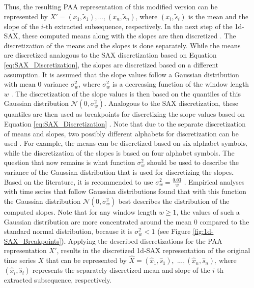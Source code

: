 Thus, the resulting \ac{PAA} representation of this modified version can be represented by $X' = (\overline{x}_1, \tilde{s}_1), ..., (\overline{x}_n, \tilde{s}_n)$, where $(\overline{x}_i, \tilde{s}_i)$ is the mean and the slope of the $i$-th extracted subsequence, respectively. \newline
In the next step of the \ac{1d-SAX}, these computed means along with the slopes are then discretized \cite{1d-SAX}. The discretization of the means and the slopes is done separately. While the means are discretized analogous to the \ac{SAX} discretization based on Equation \ref{eq:SAX_Discretization}, the slopes are discretized based on a different assumption. \newline
It is assumed that the slope values follow a Gaussian distribution with mean 0 variance $\sigma^{2}_w$, where $\sigma^{2}_w$ is a decreasing function of the window length $w$ \cite{1d-SAX}. The discretization of the slope values is then based on the quantiles of this Gaussian distribution $\mathcal{N}(0,\sigma^{2}_w)$. Analogous to the \ac{SAX} discretization, these quantiles are then used as breakpoints for discretizing the slope values based on Equation \ref{eq:SAX_Discretization} \cite{1d-SAX}. Note that due to the separate discretization of means and slopes, two possibly different alphabets for discretization can be used \cite{1d-SAX}. For example, the means can be discretized based on six alphabet symbols, while the discretization of the slopes is based on four alphabet symbols. \newline
The question that now remains is what function $\sigma^{2}_w$ should be used to describe the variance of the Gaussian distribution that is used for discretizing the slopes. Based on the literature, it is recommended to use $\sigma^{2}_w = \frac{0.03}{w}$ \cite{1d-SAX}. Empirical analyses with time series that follow Gaussian distributions found that with this function the Gaussian distribution $\mathcal{N}(0,\sigma^{2}_w)$ best describes the distribution of the computed slopes. Note that for any window length $w \geq 1$, the values of such a Gaussian distribution are more concentrated around the mean $0$ compared to the standard normal distribution, because it is $\sigma^{2}_w < 1$ (see Figure \ref{fig:1d-SAX_Breakpoints}). \newline
Applying the described discretizations for the \ac{PAA} representation $X'$, results in the discretized \ac{1d-SAX} representation of the original time series $X$ that can be represented by $\hat{X} = (\hat{x}_1, \hat{s}_1),$ $..., (\hat{x}_n, \hat{s}_n)$, where $(\hat{x}_i, \hat{s}_i)$ represents the separately discretized mean and slope of the $i$-th extracted subsequence, respectively. \newline
